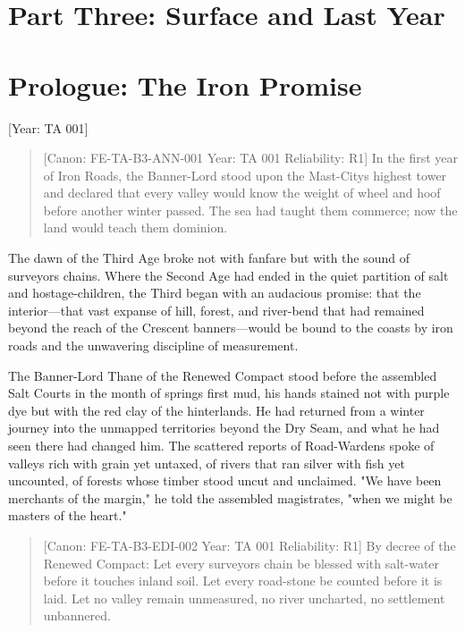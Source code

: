 \section{Part Three: Surface and Last
Year}\label{part-three-surface-and-last-year}

\section{Prologue: The Iron Promise}\label{prologue-the-iron-promise}

{[}Year: TA 001{]}

\begin{quote}
{[}Canon: FE-TA-B3-ANN-001 \textbar{} Year: TA 001 \textbar{}
Reliability: R1{]} In the first year of Iron Roads, the Banner-Lord
stood upon the Mast-City\textquotesingle s highest tower and declared
that every valley would know the weight of wheel and hoof before another
winter passed. The sea had taught them commerce; now the land would
teach them dominion.
\end{quote}

The dawn of the Third Age broke not with fanfare but with the sound of
surveyor\textquotesingle s chains. Where the Second Age had ended in the
quiet partition of salt and hostage-children, the Third began with an
audacious promise: that the interior---that vast expanse of hill,
forest, and river-bend that had remained beyond the reach of the
Crescent banners---would be bound to the coasts by iron roads and the
unwavering discipline of measurement.

The Banner-Lord Thane of the Renewed Compact stood before the assembled
Salt Courts in the month of spring\textquotesingle s first mud, his
hands stained not with purple dye but with the red clay of the
hinterlands. He had returned from a winter journey into the unmapped
territories beyond the Dry Seam, and what he had seen there had changed
him. The scattered reports of Road-Wardens spoke of valleys rich with
grain yet untaxed, of rivers that ran silver with fish yet uncounted, of
forests whose timber stood uncut and unclaimed. "We have been merchants
of the margin," he told the assembled magistrates, "when we might be
masters of the heart."

\begin{quote}
{[}Canon: FE-TA-B3-EDI-002 \textbar{} Year: TA 001 \textbar{}
Reliability: R1{]} By decree of the Renewed Compact: Let every
surveyor\textquotesingle s chain be blessed with salt-water before it
touches inland soil. Let every road-stone be counted before it is laid.
Let no valley remain unmeasured, no river uncharted, no settlement
unbannered.
\end{quote}

